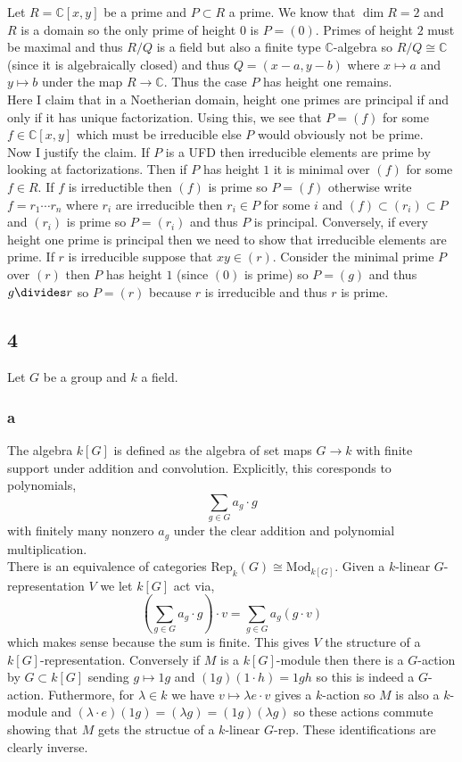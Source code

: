 \documentclass[12pt]{article}
\renewcommand{\C}{\mathbb{C}}
\begin{document}
Let $R = \C[x,y]$ be a prime and $P \subset R$ a prime. We know that $\dim{R} = 2$ and $R$ is a domain so the only prime of height $0$ is $P = (0)$. Primes of height $2$ must be maximal and thus $R / Q$ is a field but also a finite type $\C$-algebra so $R / Q \cong \C$ (since it is algebraically closed) and thus $Q = (x - a, y - b)$ where $x \mapsto a$ and $y \mapsto b$ under the map $R \to \C$. Thus the case $P$ has height one remains.
\bigskip\\
Here I claim that in a Noetherian domain, height one primes are principal if and only if it has unique factorization. Using this,  we see that $P = (f)$ for some $f \in \C[x,y]$ which must be irreducible else $P$ would obviously not be prime. 
\bigskip\\
Now I justify the claim. If $P$ is a UFD then irreducible elements are prime by looking at factorizations. Then if $P$ has height $1$ it is minimal over $(f)$ for some $f \in R$. If $f$ is irreductible then $(f)$ is prime so $P = (f)$ otherwise write $f = r_1 \cdots r_n$ where $r_i$ are irreducible then $r_i \in P$ for some $i$ and $(f) \subset (r_i) \subset P$ and $(r_i)$ is prime so $P = (r_i)$ and thus $P$ is principal. Conversely, if every height one prime is principal then we need to show that irreducible elements are prime. If $r$ is irreducible suppose that $xy \in (r)$. Consider the minimal prime $P$ over $(r)$ then $P$ has height $1$ (since $(0)$ is prime) so $P = (g)$ and thus $g \divides r$ so $P = (r)$ because $r$ is irreducible and thus $r$ is prime.

\subsection{4}

Let $G$ be a group and $k$ a field.

\subsubsection{a}

The algebra $k[G]$ is defined as the algebra of set maps  $G \to k$ with finite support under addition and convolution. Explicitly, this coresponds to polynomials,
\[ \sum_{g \in G} a_g \cdot g \]
with finitely many nonzero $a_g$ under the clear addition and polynomial multiplication. 
\bigskip\\
There is an equivalence of categories $\mathrm{Rep}_k(G) \cong \mathrm{Mod}_{k[G]}$. Given a $k$-linear $G$-representation $V$ we let $k[G]$ act via,
\[ \left( \sum_{g \in G} a_g \cdot g \right) \cdot v = \sum_{g \in G} a_g (g \cdot v) \]
which makes sense because the sum is finite. This gives $V$ the structure of a $k[G]$-representation. Conversely if $M$ is a $k[G]$-module then there is a $G$-action by $G \subset k[G]$ sending $g \mapsto 1 g$ and $(1 g)(1 \cdot h) = 1 gh$ so this is indeed a $G$-action. Futhermore, for $\lambda \in k$ we have $v \mapsto \lambda e \cdot v$ gives a $k$-action so $M$ is also a $k$-module and $(\lambda \cdot e)(1 g) = (\lambda  g) = (1 g)(\lambda g)$ so these actions commute showing that $M$ gets the structue of a $k$-linear $G$-rep. These identifications are clearly inverse.
\end{document}
